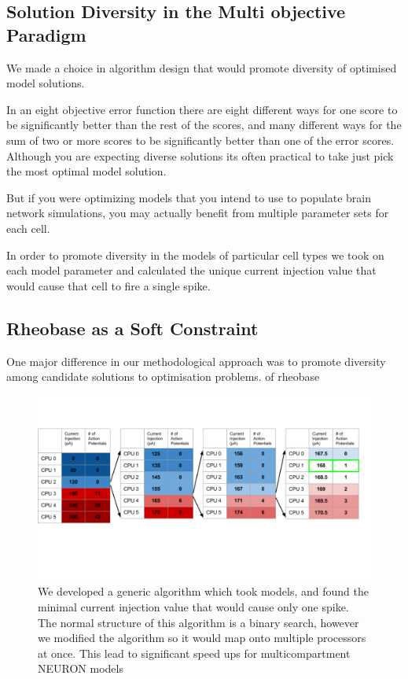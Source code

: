 

\subsection{Solution Diversity in the Multi objective Paradigm}


We made a choice in algorithm design that would promote diversity of optimised model solutions.


In an eight objective error function there are eight different ways for one score to be significantly better than the rest of the scores, and many different ways for the sum of two or more scores to be significantly better than one of the error scores. Although you are expecting diverse solutions its often practical to take just pick the most optimal model solution.

But if you were optimizing models that you intend to use to populate brain network simulations, you may actually benefit from multiple parameter sets for each cell.

In order to promote diversity in the models of particular cell types we took on each model parameter and calculated the unique current injection value that would cause that cell to fire a single spike. 

\subsection{Rheobase as a Soft Constraint}
One major difference in our methodological approach was to promote diversity among candidate solutions to optimisation problems. 
of rheobase 
\begin{figure}    
\begin{center}
\includegraphics[width=0.7\linewidth]{figures/rheobase_algorithm}
\caption{We developed a generic algorithm which took models, and found the minimal current injection value that would cause only one spike. The normal structure of this algorithm is a binary search, however we modified the algorithm so it would map onto multiple processors at once. This lead to significant speed ups for multicompartment NEURON models}

\end{center}
\end{figure}  

